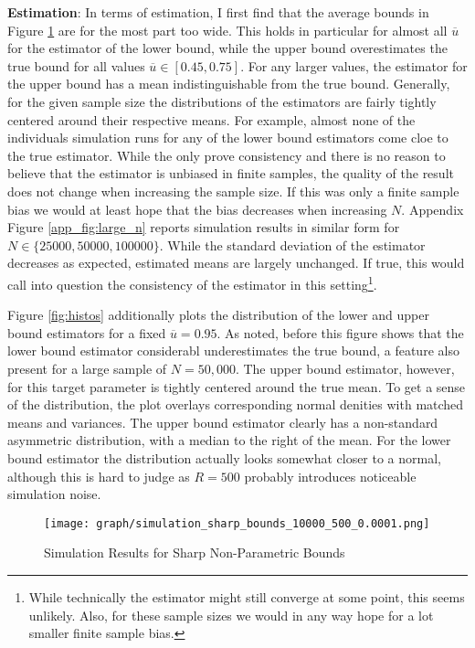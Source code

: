 \documentclass[11pt, a4paper, leqno]{article}
\begin{document}
\textbf{Estimation}: In terms of estimation, I first find that the average bounds in Figure \ref{fig:main_sim_violin} are for the most part too wide. This holds in particular for almost all $\overline{u}$ for the estimator of the lower bound, while the upper bound overestimates the true bound for all values $\overline{u}\in[0.45, 0.75]$. For any larger values, the estimator for the upper bound has a mean indistinguishable from the true bound.
Generally, for the given sample size the distributions of the estimators are fairly tightly centered around their respective means. For example, almost none of the individuals simulation runs for any of the lower bound estimators come cloe to the true estimator.
While the \citet{mogstad2018using} only prove consistency and there is no reason to believe that the estimator is unbiased in finite samples, the quality of the result does not change when increasing the sample size.
If this was only a finite sample bias we would at least hope that the bias decreases when increasing $N$. Appendix Figure \ref{app_fig:large_n} reports simulation results in similar form for $N\in\{25000, 50000, 100000\}$. While the standard deviation of the estimator decreases as expected, estimated means are largely unchanged.
If true, this would call into question the consistency of the estimator in this setting\footnote{While technically the estimator might still converge at some point, this seems unlikely. Also, for these sample sizes we would in any way hope for a lot smaller finite sample bias.}.

Figure \ref{fig:histos} additionally plots the distribution of the lower and upper bound estimators for a fixed $\overline{u}=0.95$.
As noted, before this figure shows that the lower bound estimator considerabl underestimates the true bound, a feature also present for a large sample of $N=50,000$.
The upper bound estimator, however, for this target parameter is tightly centered around the true mean.
To get a sense of the distribution, the plot overlays corresponding normal denities with matched means and variances. The upper bound estimator clearly has a non-standard asymmetric distribution, with a median to the right of the mean.
For the lower bound estimator the distribution actually looks somewhat closer to a normal, although this is hard to judge as $R=500$ probably introduces noticeable simulation noise.

\begin{figure}
    \caption{Simulation Results for Sharp Non-Parametric Bounds \label{fig:main_sim_violin}}
    \texttt{[image: graph/simulation\_sharp\_bounds\_10000\_500\_0.0001.png]}
\end{figure}
\end{document}
